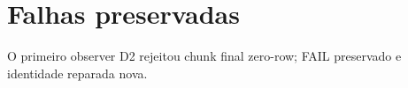 \section{Falhas preservadas}
O primeiro observer D2 rejeitou chunk final zero-row; FAIL preservado e identidade reparada nova.

